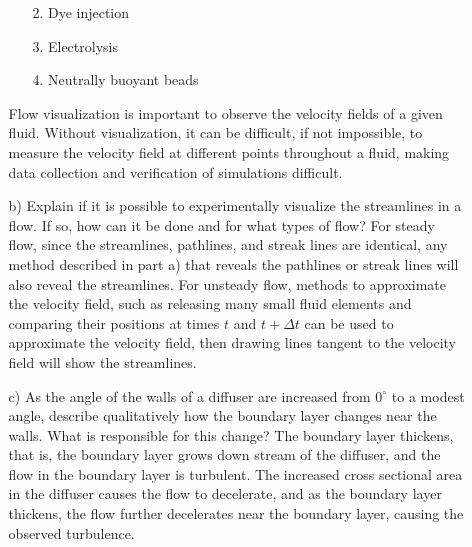 \documentclass{article}
\begin{document}
\begin{itemize}
\begin{itemize}
\begin{itemize}
            \item[2.] Dye injection

            \item[3.] Electrolysis

            \item[4.] Neutrally buoyant beads
        \end{itemize}
        Flow visualization is important to observe the velocity fields of a given fluid. Without visualization, it can be difficult, if not impossible, to measure the velocity field at different points throughout a fluid, making data collection and verification of simulations difficult.


        \item[b)] Explain if it is possible to experimentally visualize the streamlines in a flow. If so, how can it be done and for what types of flow?
        \newline\newline
        For steady flow, since the streamlines, pathlines, and streak lines are identical, any method described in part a) that reveals the pathlines or streak lines will also reveal the streamlines. 
        \newline
        For unsteady flow, methods to approximate the velocity field, such as releasing many small fluid elements and comparing their positions at times $t$ and $t + \Delta t$ can be used to approximate the velocity field, then drawing lines tangent to the velocity field will show the streamlines.
        \newline\newline

        \item[c)] As the angle of the walls of a diffuser are increased from $0^{\circ}$ to a modest angle, describe qualitatively how the boundary layer changes near the walls. What is responsible for this change?
        \newline\newline
        The boundary layer thickens, that is, the boundary layer grows down stream of the diffuser, and the flow in the boundary layer is turbulent. The increased cross sectional area in the diffuser causes the flow to decelerate, and as the boundary layer thickens, the flow further decelerates near the boundary layer, causing the observed turbulence.
        \newline\newline


\end{itemize}
\end{itemize}
\end{document}
